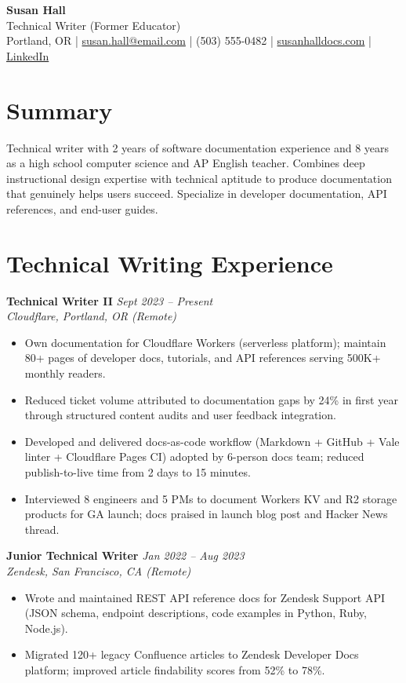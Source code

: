 \documentclass[11pt,a4paper]{article}
\begin{document}
\begin{center}
  {\LARGE \textbf{Susan Hall}}\\[3pt]
  {\large \textcolor{accent}{Technical Writer}} \quad (Former Educator)\\[4pt]
  Portland, OR \quad|\quad
  \href{mailto:susan.hall@email.com}{susan.hall@email.com} \quad|\quad
  (503) 555-0482 \quad|\quad
  \href{https://susanhalldocs.com}{susanhalldocs.com} \quad|\quad
  \href{https://linkedin.com/in/susanhall-tw}{LinkedIn}
\end{center}

\section{Summary}
Technical writer with 2 years of software documentation experience and 8 years as a high school computer science and AP English teacher. Combines deep instructional design expertise with technical aptitude to produce documentation that genuinely helps users succeed. Specialize in developer documentation, API references, and end-user guides.

\section{Technical Writing Experience}

\noindent\textbf{Technical Writer II} \hfill \textit{Sept 2023 -- Present}\\
\textit{Cloudflare, Portland, OR (Remote)}
\begin{itemize}
  \item Own documentation for Cloudflare Workers (serverless platform); maintain 80+ pages of developer docs, tutorials, and API references serving 500K+ monthly readers.
  \item Reduced ticket volume attributed to documentation gaps by 24\% in first year through structured content audits and user feedback integration.
  \item Developed and delivered docs-as-code workflow (Markdown + GitHub + Vale linter + Cloudflare Pages CI) adopted by 6-person docs team; reduced publish-to-live time from 2 days to 15 minutes.
  \item Interviewed 8 engineers and 5 PMs to document Workers KV and R2 storage products for GA launch; docs praised in launch blog post and Hacker News thread.
\end{itemize}

\vspace{4pt}
\noindent\textbf{Junior Technical Writer} \hfill \textit{Jan 2022 -- Aug 2023}\\
\textit{Zendesk, San Francisco, CA (Remote)}
\begin{itemize}
  \item Wrote and maintained REST API reference docs for Zendesk Support API (JSON schema, endpoint descriptions, code examples in Python, Ruby, Node.js).
  \item Migrated 120+ legacy Confluence articles to Zendesk Developer Docs platform; improved article findability scores from 52\% to 78\%.
\end{itemize}
\end{document}
